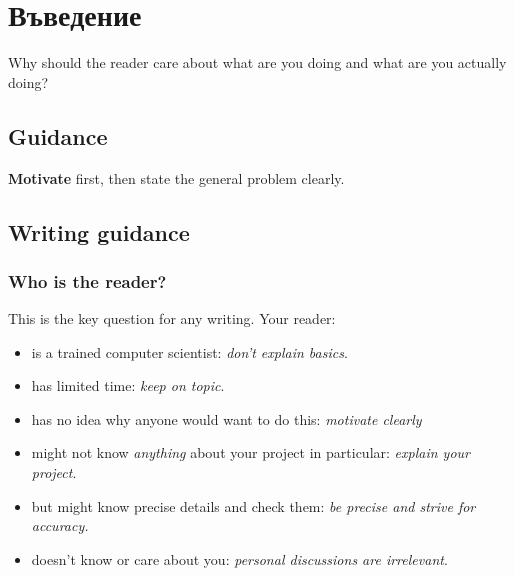 \chapter{Въведение}





Why should the reader care about what are you doing and what are you actually doing?

\section{Guidance}

\textbf{Motivate} first, then state the general problem clearly. 

\section{Writing guidance}
\subsection{Who is the reader?}

This is the key question for any writing. Your reader:

\begin{itemize}
    \item
    is a trained computer scientist: \emph{don't explain basics}.
    \item
    has limited time: \emph{keep on topic}.
    \item
    has no idea why anyone would want to do this: \emph{motivate clearly}
    \item
    might not know \emph{anything} about your project in particular:
    \emph{explain your project}.
    \item
    but might know precise details and check them: \emph{be precise and
    strive for accuracy.}
    \item
    doesn't know or care about you: \emph{personal discussions are
    irrelevant}.
\end{itemize}

